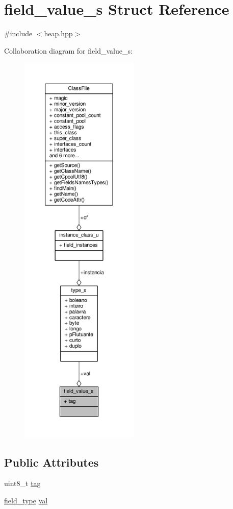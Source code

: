 \hypertarget{structfield__value__s}{\section{field\+\_\+value\+\_\+s Struct Reference}
\label{structfield__value__s}
}


{\ttfamily \#include $<$heap.\+hpp$>$}



Collaboration diagram for field\+\_\+value\+\_\+s\+:\nopagebreak
\begin{figure}[H]
\begin{center}
\leavevmode
\includegraphics[height=550pt]{structfield__value__s__coll__graph}
\end{center}
\end{figure}
\subsection*{Public Attributes}
\begin{DoxyCompactItemize}
\item 
uint8\+\_\+t \hyperlink{structfield__value__s_a4fe2c4d897f539e3b0f3d50ecc5083c1}{tag}
\item 
\hyperlink{heap_8hpp_ae5c0f9a3fc75861baaa7475c345f119d}{field\+\_\+type} \hyperlink{structfield__value__s_ac2dfcee3f37fc6387bbf5b7a9a5eeb6b}{val}
\end{DoxyCompactItemize}


